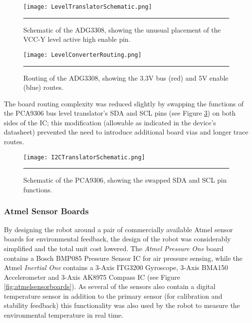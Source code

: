 \begin{figure}[tbph]
	\centering
		\texttt{[image: LevelTranslatorSchematic.png]}
	\rule{35em}{0.5pt}
	\caption[Bidirectional Level Translator Schematic]{Schematic of the ADG3308, showing the unusual placement of the VCC-Y level active high enable pin.}
	\label{fig:ADG3308schematic}
\end{figure}

\begin{figure}[tbph]
	\centering
		\texttt{[image: LevelConverterRouting.png]}
	\rule{35em}{0.5pt}
	\caption[Bidirectional Level Translator Routing]{Routing of the ADG3308, showing the 3.3V bus (red) and 5V enable (blue) routes.}
	\label{fig:ADG3308routing}
\end{figure}

The board routing complexity was reduced slightly by swapping the functions of the PCA9306 bus level translator's SDA and SCL pins (see Figure \ref{fig:PCA9306schematic}) on both sides of the IC; this modification (allowable as indicated in the device's datasheet) prevented the need to introduce additional board vias and longer trace routes.

\begin{figure}[tbph]
	\centering
		\texttt{[image: I2CTranslatorSchematic.png]}
	\rule{35em}{0.5pt}
	\caption[I\textsuperscript{2}C Level Translator Schematic]{Schematic of the PCA9306, showing the swapped SDA and SCL pin functions.}
	\label{fig:PCA9306schematic}
\end{figure}

\FloatBarrier
\subsubsection{Atmel Sensor Boards}

By designing the robot around a pair of commercially available Atmel sensor boards for environmental feedback, the design of the robot was considerably simplified and the total unit cost lowered. The \textit{Atmel Pressure One} board contains a Bosch BMP085 Pressure Sensor IC for air pressure sensing, while the Atmel \textit{Inertial One} contains a 3-Axis ITG3200 Gyroscope, 3-Axis BMA150 Accelerometer and 3-Axis AK8975 Compass IC (see Figure \ref{fig:atmelsensorboards}). As several of the sensors also contain a digital temperature sensor in addition to the primary sensor (for calibration and stability feedback) this functionality was also used by the robot to measure the environmental temperature in real time.

